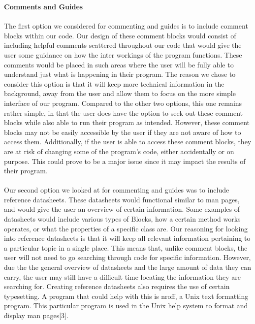 \documentclass[journal,10pt,onecolumn,compsoc]{IEEEtran} \usepackage[margin=1.0in]{geometry} \usepackage{pdfpages} \usepackage{graphicx}
\begin{document}
\newpage
\noindent \textbf{Comments and Guides} 
\\
\\
\indent The first option we considered for commenting and guides is to include comment blocks within our code. Our design of these comment blocks would consist of including helpful comments scattered throughout our code that would give the user some guidance on how the inter workings of the program functions. These comments would be placed in such areas where the user will be fully able to understand just what is happening in their program. The reason we chose to consider this option is that it will keep more technical information in the background, away from the user and allow them to focus on the more simple interface of our program. Compared to the other two options, this one remains rather simple, in that the user does have the option to seek out these comment blocks while also able to run their program as intended. However, these comment blocks may not be easily accessible by the user if they are not aware of how to access them. Additionally, if the user is able to access these comment blocks, they are at risk of changing some of the program's code, either accidentally or on purpose. This could prove to be a major issue since it may impact the results of their program. 
\\
\\
\indent Our second option we looked at for commenting and guides was to include reference datasheets. These datasheets would functional similar to man pages, and would give the user an overview of certain information. Some examples of datasheets would include various types of Blocks, how a certain method works operates, or what the properties of a specific class are. Our reasoning for looking into reference datasheets is that it will keep all relevant information pertaining to a particular topic in a single place. This means that, unlike comment blocks, the user will not need to go searching through code for specific information. However, due the the general overview of datasheets and the large amount of data they can carry, the user may still have a difficult time locating the information they are searching for. Creating reference datasheets also requires the use of certain typesetting. A program that could help with this is nroff, a Unix text formatting program. This particular program is used in the Unix help system to format and display man pages[3].
\\
\\
\end{document}

